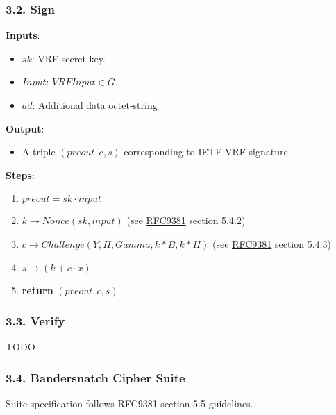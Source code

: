 \documentclass[
]{article}
\providecommand{\tightlist}{%
  \setlength{\itemsep}{0pt}\setlength{\parskip}{0pt}}
\begin{document}
\hypertarget{sign}{%
\subsubsection{3.2. Sign}\label{sign}}

\textbf{Inputs}:

\begin{itemize}
\tightlist
\item
  \(sk\): VRF secret key.
\item
  \(Input\): \(VRFInput \in G\).
\item
  \(ad\): Additional data octet-string
\end{itemize}

\textbf{Output}:

\begin{itemize}
\tightlist
\item
  A triple \((preout, c, s)\) corresponding to IETF VRF signature.
\end{itemize}

\textbf{Steps}:

\begin{enumerate}
\def\labelenumi{\arabic{enumi}.}
\tightlist
\item
  \(preout = sk \cdot input\)
\item
  \(k \rightarrow Nonce(sk, input)\) (see
  \href{https://datatracker.ietf.org/doc/rfc9381/}{RFC9381} section
  5.4.2)
\item
  \(c \rightarrow Challenge(Y, H, Gamma, k*B, k*H)\) (see
  \href{https://datatracker.ietf.org/doc/rfc9381/}{RFC9381} section
  5.4.3)
\item
  \(s \rightarrow (k + c \cdot x)\)
\item
  \textbf{return} \((preout, c, s)\)
\end{enumerate}

\hypertarget{verify}{%
\subsubsection{3.3. Verify}\label{verify}}

TODO

\hypertarget{bandersnatch-cipher-suite}{%
\subsubsection{3.4. Bandersnatch Cipher
Suite}\label{bandersnatch-cipher-suite}}

Suite specification follows RFC9381 section 5.5 guidelines.
\end{document}
